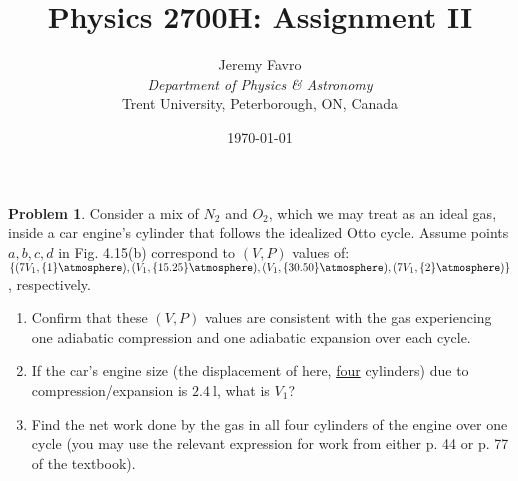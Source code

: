\documentclass[10pt]{article}
\title{Physics 2700H: Assignment II}
\author{Jeremy Favro \\\emph{Department of Physics \& Astronomy}\\ Trent University, Peterborough, ON, Canada}
\date{\today}
\theoremstyle{definition}
\newtheorem{problem}{Problem}
\begin{document}
\maketitle

\begin{problem}
Consider a mix of $N_2$ and $O_2$, which we may treat as an ideal gas, inside a car engine's cylinder that
follows the idealized Otto cycle. Assume points ${a,b,c,d}$ in Fig. 4.15(b)
correspond to $(V,P)$ values of: $\left\{(7V_1,\qty{1}{\atmosphere}), (V_1, \qty{15.25}{\atmosphere}), (V_1, \qty{30.50}{\atmosphere}), (7V_1, \qty{2}{\atmosphere})\right\}$,
respectively.
\begin{enumerate}[label=(\alph*)]
  \item Confirm that these $(V,P)$ values are consistent with the gas experiencing one adiabatic
        compression and one adiabatic expansion over each cycle.
  \item If the car's engine size (the displacement of here, \underline{four} cylinders) due to compression/expansion is $\qty{2.4}{\litre}$, what is $V_1$?
  \item Find the net work done by the gas in all four cylinders of the engine over one cycle (you may use the relevant expression for work from either p. 44 or p. 77 of the textbook).
\end{enumerate}
\end{problem}
\end{document}
